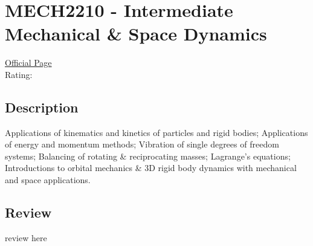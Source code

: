 \hypertarget{MECH2210}{\section{MECH2210 - Intermediate Mechanical \& Space Dynamics}}

\large
\textcolor{turbo_purple}{\href{https://my.uq.edu.au/programs-courses/course.html?course_code=MECH2210}{Official Page}} \\
Rating: \cstar\cstar\cstar\cstar\ostar

\normalsize
\subsection*{Description}
Applications of kinematics and kinetics of particles and rigid bodies; Applications of energy and momentum methods; Vibration of single degrees of freedom systems; Balancing of rotating \& reciprocating masses; Lagrange's equations; Introductions to orbital mechanics \& 3D rigid body dynamics with mechanical and space applications.

\subsection*{Review}
review here
